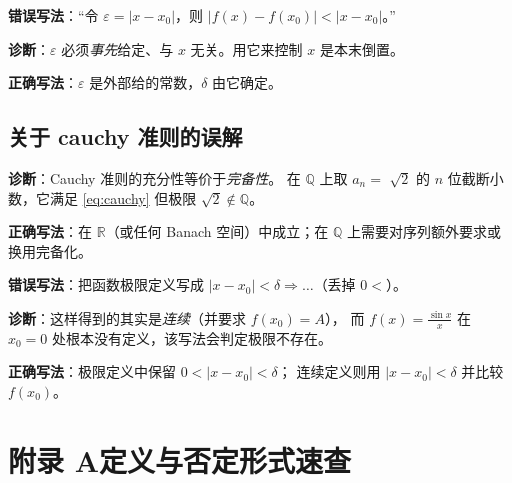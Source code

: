 \documentclass[11pt,a4paper]{ctexart}
\theoremstyle{definition}
\theoremstyle{remark}
\newcommand{\R}{\mathbb{R}}
\newcommand{\Q}{\mathbb{Q}}
\newcommand{\eps}{\varepsilon}
\newcommand{\abs}[1]{\left\lvert #1 \right\rvert}
\begin{document}
\begin{warnbox}[错误 4：取 $\eps$ 时用了 $x$]
\textbf{错误写法}：“令 $\eps=\abs{x-x_0}$，则 $\abs{f(x)-f(x_0)}<\abs{x-x_0}$。”
\par\smallskip
\textbf{诊断}：$\eps$ 必须\emph{事先}给定、与 $x$ 无关。用它来控制 $x$ 是本末倒置。
\par\smallskip
\textbf{正确写法}：$\eps$ 是外部给的常数，$\delta$ 由它确定。
\end{warnbox}

\subsection{关于 cauchy 准则的误解}

\begin{warnbox}
\textbf{诊断}：Cauchy 准则的充分性等价于\emph{完备性}。
在 $\Q$ 上取 $a_n=$ $\sqrt2$ 的 $n$ 位截断小数，它满足 \eqref{eq:cauchy} 但极限 $\sqrt2\notin\Q$。
\par\smallskip
\textbf{正确写法}：在 $\R$（或任何 Banach 空间）中成立；在 $\Q$ 上需要对序列额外要求或换用完备化。
\end{warnbox}

\begin{warnbox}[错误 6：忽略“$x\neq x_0$”]
\textbf{错误写法}：把函数极限定义写成 $\abs{x-x_0}<\delta\Rightarrow\dots$（丢掉 $0<$）。
\par\smallskip
\textbf{诊断}：这样得到的其实是\emph{连续}（并要求 $f(x_0)=A$），
而 $f(x)=\frac{\sin x}{x}$ 在 $x_0=0$ 处根本没有定义，该写法会判定极限不存在。
\par\smallskip
\textbf{正确写法}：极限定义中保留 $0<\abs{x-x_0}<\delta$；
连续定义则用 $\abs{x-x_0}<\delta$ 并比较 $f(x_0)$。
\end{warnbox}

\newpage

\appendix
\section*{附录 A\quad 定义与否定形式速查}
\end{document}
